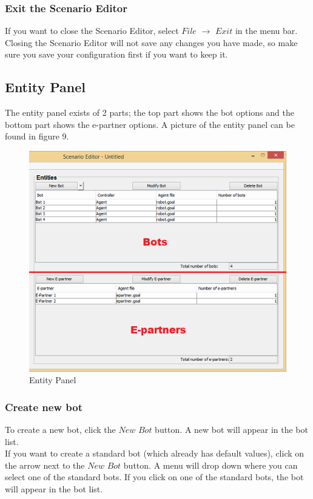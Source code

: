 \documentclass[11pt,a4paper]{article}
\begin{document}
\subsubsection{Exit the Scenario Editor}
If you want to close the Scenario Editor, select $File$ $\to$ $Exit$ in the menu bar. Closing the Scenario Editor will not save any changes you have made, so make sure you save your configuration first if you want to keep it.

\subsection{Entity Panel}
The entity panel exists of 2 parts; the top part shows the bot options and the bottom part shows the e-partner options. A picture of the entity panel can be found in figure 9.
\begin{figure}[h]
\begin{center}
\includegraphics{bot.png}
\end{center}
\caption{Entity Panel}
\end{figure}
\subsubsection{Create new bot}
To create a new bot, click the $New$ $Bot$ button. A new bot will appear in the bot list.\\
If you want to create a standard bot (which already has default values), click on the arrow next to the $New$ $Bot$ button. A menu will drop down where you can select one of the standard bots. If you click on one of the standard bots, the bot will appear in the bot list.
\end{document}
